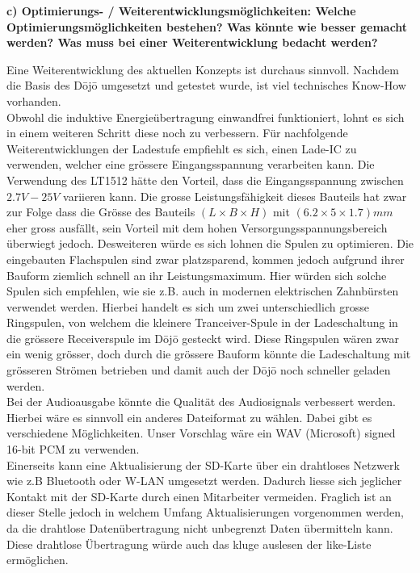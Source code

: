 \textbf{c) Optimierungs- / Weiterentwicklungsmöglichkeiten: Welche Optimierungsmöglichkeiten bestehen? Was könnte wie besser gemacht werden? Was muss bei einer Weiterentwicklung bedacht werden?}

Eine Weiterentwicklung des aktuellen Konzepts ist durchaus sinnvoll. Nachdem die Basis des Dōjō umgesetzt und getestet wurde, ist viel technisches \glqq Know-How \grqq vorhanden.\\
Obwohl die induktive Energieübertragung einwandfrei funktioniert, lohnt es sich in einem weiteren Schritt diese noch zu verbessern. Für nachfolgende Weiterentwicklungen der Ladestufe empfiehlt es sich, einen Lade-IC zu verwenden, welcher eine grössere Eingangsspannung verarbeiten kann. Die Verwendung des LT1512 hätte den Vorteil, dass die Eingangsspannung zwischen $2.7V - 25V$ variieren kann. Die grosse Leistungsfähigkeit dieses Bauteils hat zwar zur Folge dass die Grösse des Bauteils $(L \times B \times H)$ mit $(6.2\times 5\times 1.7)mm$ eher gross ausfällt, sein Vorteil mit dem hohen Versorgungsspannungsbereich überwiegt jedoch. Desweiteren würde es sich lohnen die Spulen zu optimieren. Die eingebauten Flachspulen sind zwar platzsparend, kommen jedoch aufgrund ihrer Bauform ziemlich schnell an ihr Leistungsmaximum. Hier würden sich solche Spulen sich empfehlen, wie sie z.B. auch in modernen elektrischen Zahnbürsten verwendet werden. Hierbei handelt es sich um zwei unterschiedlich grosse Ringspulen, von welchem die kleinere Tranceiver-Spule in der Ladeschaltung in die grössere Receiverspule  im Dōjō gesteckt wird. Diese Ringspulen wären zwar ein wenig grösser, doch durch die grössere Bauform könnte die Ladeschaltung mit grösseren Strömen betrieben und damit auch der Dōjō noch schneller geladen werden.\\
Bei der Audioausgabe könnte die Qualität des Audiosignals verbessert werden. Hierbei wäre es sinnvoll ein anderes Dateiformat zu wählen. Dabei gibt es verschiedene Möglichkeiten. Unser Vorschlag wäre ein WAV (Microsoft) signed 16-bit PCM zu verwenden.\\
Einerseits kann eine Aktualisierung der SD-Karte über ein drahtloses Netzwerk wie z.B Bluetooth oder W-LAN umgesetzt werden. Dadurch liesse sich jeglicher Kontakt mit der SD-Karte durch einen Mitarbeiter vermeiden. Fraglich ist an dieser Stelle jedoch in welchem Umfang Aktualisierungen vorgenommen werden, da die drahtlose Datenübertragung nicht unbegrenzt Daten übermitteln kann. Diese drahtlose Übertragung würde auch das kluge auslesen der like-Liste ermöglichen.\\
